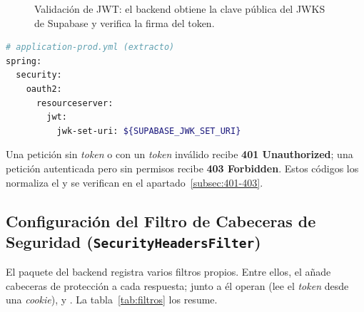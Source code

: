 \vspace{0.3cm}
\begin{figure}[h!]
\centering
{}
\caption{Validación de JWT: el backend obtiene la clave pública del JWKS de Supabase y verifica la firma del token.}%
\label{fig:jwt}
\end{figure}

\begin{lstlisting}[language=bash]
# application-prod.yml (extracto)
spring:
  security:
    oauth2:
      resourceserver:
        jwt:
          jwk-set-uri: ${SUPABASE_JWK_SET_URI}
\end{lstlisting}

\begin{VerificacionOK}
Una petición sin \textit{token} o con un \textit{token} inválido recibe \textbf{401
Unauthorized}; una petición autenticada pero sin permisos recibe \textbf{403 Forbidden}.
Estos códigos los normaliza el  y se verifican en el
apartado~\ref{subsec:401-403}.
\end{VerificacionOK}

\subsection[Filtro de Cabeceras de Seguridad]{Configuración del Filtro de Cabeceras de Seguridad (\texttt{Security\-Headers\-Filter})}%
\label{subsec:headers}

El paquete  del backend registra varios filtros propios. Entre ellos, el
 añade cabeceras de protección a cada respuesta; junto a él
operan  (lee el \textit{token} desde una \textit{cookie}),
 y . La tabla~\ref{tab:filtros} los
resume.\par

